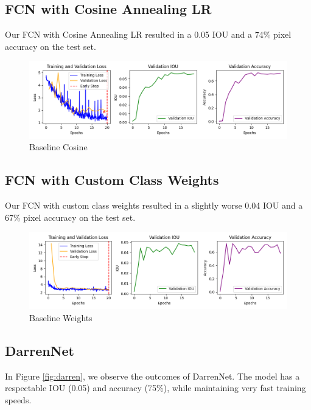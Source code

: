 \subsection*{FCN with Cosine Annealing LR}

Our FCN with Cosine Annealing LR resulted in a 0.05 IOU and a 74\% pixel accuracy on the test set.


\begin{figure}[H]
	\centering
	\includegraphics[width=\textwidth]{plots/baseline_cosine}
	\caption{Baseline Cosine}
	\label{fig:baseline_cos}
\end{figure}

\subsection*{FCN with Custom Class Weights}


Our FCN with custom class weights resulted in a slightly worse 0.04 IOU and a 67\% pixel accuracy on the test set.

\begin{figure}[H]
	\centering
	\includegraphics[width=\textwidth]{plots/baseline_weights}
	\caption{Baseline Weights}
	\label{fig:baseline_weights}
\end{figure}

\subsection*{DarrenNet}

In Figure \ref{fig:darren}, we observe the outcomes of DarrenNet. The model has a respectable IOU (0.05) and accuracy (75\%), while maintaining very fast training speeds.


